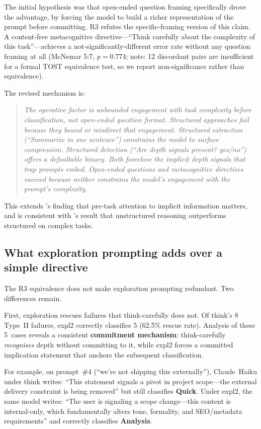 \documentclass[11pt,a4paper]{article}
\begin{document}
The initial hypothesis was that open-ended question framing specifically
drove the advantage, by forcing the model to build a richer representation
of the prompt before committing.  R3 refutes the specific-framing version
of this claim.  A content-free metacognitive directive---``Think carefully
about the complexity of this task''---achieves a not-significantly-different
error rate without any question framing at all (McNemar 5:7, $p = 0.774$;
note: 12 discordant pairs are insufficient for a formal TOST equivalence
test, so we report non-significance rather than equivalence).

The revised mechanism is:

\begin{quote}
\emph{The operative factor is unbounded engagement with task complexity
before classification, not open-ended question format.  Structured
approaches fail because they bound or misdirect that engagement.
Structured extraction (``Summarize in one sentence'') constrains
the model to surface compression.  Structured detection (``Are depth
signals present? yes/no'') offers a defaultable binary.  Both foreclose
the implicit depth signals that trap prompts embed.  Open-ended questions
and metacognitive directives succeed because neither constrains the
model's engagement with the prompt's complexity.}
\end{quote}

This extends \citet{Furniturewala2024}'s finding that pre-task attention
to implicit information matters, and is consistent with
\citet{GunasekaraRatnayake2025}'s result that unstructured reasoning
outperforms structured on complex tasks.

\subsection{What exploration prompting adds over a simple directive}

The R3 equivalence does not make exploration prompting redundant.  Two
differences remain.

First, exploration rescues failures that think-carefully does not.
Of \textsf{think}'s 8 Type~II failures, \textsf{expl2} correctly classifies 5
(62.5\% rescue rate).  Analysis of these 5~cases reveals a consistent
\textbf{commitment mechanism}: \textsf{think-carefully} \emph{recognises}
depth without committing to it, while \textsf{expl2} forces a committed
implication statement that anchors the subsequent classification.

For example, on prompt~\#4 (``we're not shipping this externally''),
Claude~Haiku under \textsf{think} writes: ``This statement signals a pivot in
project scope---the external delivery constraint is being removed'' but still
classifies \textbf{Quick}.  Under \textsf{expl2}, the same model writes:
``The user is signaling a scope change---this content is internal-only, which
fundamentally alters tone, formality, and SEO/metadata requirements'' and
correctly classifies \textbf{Analysis}.
\end{document}
